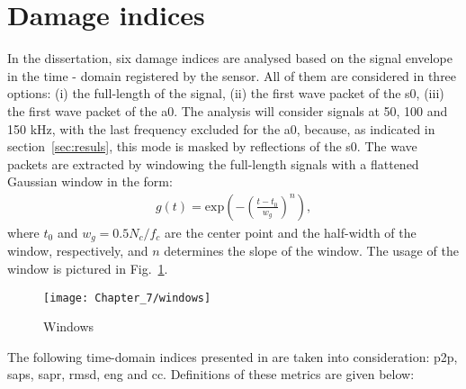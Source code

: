 \section{Damage indices}
\label{sec:di}

In the dissertation, six damage indices are analysed based on the signal envelope in the time - domain registered by the sensor.
All of them are considered in three options: (i) the full-length of the signal, (ii) the first wave packet of the \ac{s0}, (iii) the first wave packet of the \ac{a0}.
The analysis will consider signals at 50, 100 and 150 \unit{\kHz}, with the last frequency excluded for the \ac{a0}, because, as indicated in section~\ref{sec:resuls}, this mode is masked by reflections of the \ac{s0}.
The wave packets are extracted by windowing the full-length signals with a flattened Gaussian window in the form:
\begin{eqnarray}
	g(t)= \mathrm{exp}\left(-\left(\frac{t-t_0}{w_g}\right) ^{n}\right),
	\label{eq:psi_g}
\end{eqnarray}
%
where \(t_0\) and \(w_g=0.5N_c/f_c\) are the center point and the half-width of the window, respectively, and  \(n\) determines the slope of the window.
The usage of the window is pictured in Fig.~\ref{fig:windows}.
\begin{figure}[!tbh]
	\begin{center}
		\texttt{[image: Chapter\_7/windows]}
	\end{center}
	\caption{Windows}
	\label{fig:windows}
\end{figure}


The following time-domain indices presented in \cite{torkamani2014novel, moix2016damage} are taken into consideration: \ac{p2p}, \ac{saps}, \ac{sapr}, \acf{rmsd}, \ac{eng} and \ac{cc}.
Definitions of these metrics are given below:

